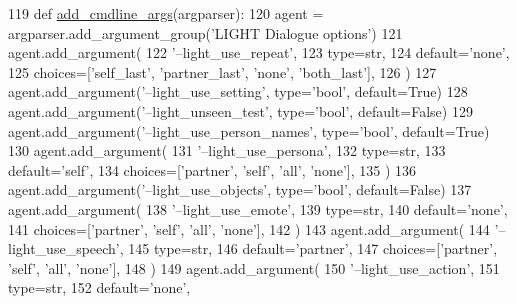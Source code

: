 \begin{DoxyCode}
119     \textcolor{keyword}{def }\hyperlink{namespaceparlai_1_1agents_1_1drqa_1_1config_a62fdd5554f1da6be0cba185271058320}{add\_cmdline\_args}(argparser):
120         agent = argparser.add\_argument\_group(\textcolor{stringliteral}{'LIGHT Dialogue options'})
121         agent.add\_argument(
122             \textcolor{stringliteral}{'--light\_use\_repeat'},
123             type=str,
124             default=\textcolor{stringliteral}{'none'},
125             choices=[\textcolor{stringliteral}{'self\_last'}, \textcolor{stringliteral}{'partner\_last'}, \textcolor{stringliteral}{'none'}, \textcolor{stringliteral}{'both\_last'}],
126         )
127         agent.add\_argument(\textcolor{stringliteral}{'--light\_use\_setting'}, type=\textcolor{stringliteral}{'bool'}, default=\textcolor{keyword}{True})
128         agent.add\_argument(\textcolor{stringliteral}{'--light\_unseen\_test'}, type=\textcolor{stringliteral}{'bool'}, default=\textcolor{keyword}{False})
129         agent.add\_argument(\textcolor{stringliteral}{'--light\_use\_person\_names'}, type=\textcolor{stringliteral}{'bool'}, default=\textcolor{keyword}{True})
130         agent.add\_argument(
131             \textcolor{stringliteral}{'--light\_use\_persona'},
132             type=str,
133             default=\textcolor{stringliteral}{'self'},
134             choices=[\textcolor{stringliteral}{'partner'}, \textcolor{stringliteral}{'self'}, \textcolor{stringliteral}{'all'}, \textcolor{stringliteral}{'none'}],
135         )
136         agent.add\_argument(\textcolor{stringliteral}{'--light\_use\_objects'}, type=\textcolor{stringliteral}{'bool'}, default=\textcolor{keyword}{False})
137         agent.add\_argument(
138             \textcolor{stringliteral}{'--light\_use\_emote'},
139             type=str,
140             default=\textcolor{stringliteral}{'none'},
141             choices=[\textcolor{stringliteral}{'partner'}, \textcolor{stringliteral}{'self'}, \textcolor{stringliteral}{'all'}, \textcolor{stringliteral}{'none'}],
142         )
143         agent.add\_argument(
144             \textcolor{stringliteral}{'--light\_use\_speech'},
145             type=str,
146             default=\textcolor{stringliteral}{'partner'},
147             choices=[\textcolor{stringliteral}{'partner'}, \textcolor{stringliteral}{'self'}, \textcolor{stringliteral}{'all'}, \textcolor{stringliteral}{'none'}],
148         )
149         agent.add\_argument(
150             \textcolor{stringliteral}{'--light\_use\_action'},
151             type=str,
152             default=\textcolor{stringliteral}{'none'},

\end{DoxyCode}
